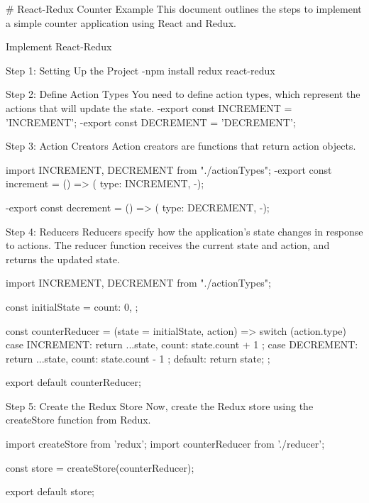 # React-Redux Counter Example
This document outlines the steps to implement a simple counter application using React and Redux.


    Implement React-Redux
    
Step 1: Setting Up the Project
    -npm install redux react-redux

Step 2: Define Action Types
    You need to define action types, which represent the actions that will update the state.
    -export const INCREMENT = 'INCREMENT';
    -export const DECREMENT = 'DECREMENT';

Step 3: Action Creators
    Action creators are functions that return action objects.

    import { INCREMENT, DECREMENT } from "./actionTypes";
    -export const increment = () => ({
    type: INCREMENT,
    -});

    -export const decrement = () => ({
    type: DECREMENT,
    -});

Step 4: Reducers
    Reducers specify how the application's state changes in response to actions. The reducer function receives the current state and action, and returns the updated state.

    import { INCREMENT, DECREMENT } from "./actionTypes";

    const initialState = {
        count: 0,
    };

    const counterReducer = (state = initialState, action) => {
        switch (action.type) {
            case INCREMENT:
                return { ...state, count: state.count + 1 };
            case DECREMENT:
                return { ...state, count: state.count - 1 };
            default:
                return state;
        }
    };

    export default counterReducer;

Step 5: Create the Redux Store
    Now, create the Redux store using the createStore function from Redux.

    import { createStore } from 'redux';
    import counterReducer from './reducer';

    const store = createStore(counterReducer);

    export default store;




